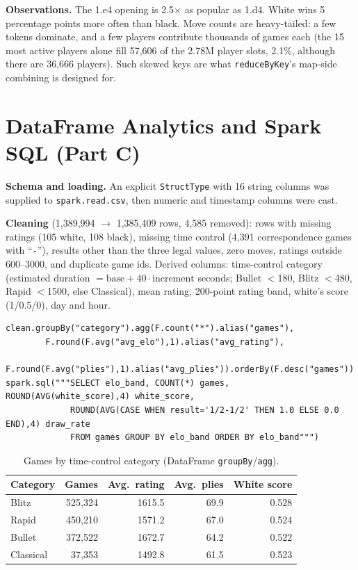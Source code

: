 \documentclass[11pt,a4paper]{article}
\begin{document}
\textbf{Observations.} The 1.e4 opening is 2.5$\times$ as popular as 1.d4. White wins
5 percentage points more often than black. Move counts are heavy-tailed: a few
tokens dominate, and a few players contribute thousands of games each
(the 15 most active players alone fill 57,606 of the 2.78M player slots, 2.1\%, although
there are 36,666 players). Such skewed keys are what \texttt{reduceByKey}'s map-side
combining is designed for.

\section{DataFrame Analytics and Spark SQL (Part C)}\label{sec:df}
\textbf{Schema and loading.} An explicit \texttt{StructType} with 16 string columns was
supplied to \texttt{spark.read.csv}, then numeric and timestamp columns were cast.

\textbf{Cleaning} (1,389,994 $\rightarrow$ 1,385,409 rows, 4,585 removed): rows with
missing ratings (105 white, 108 black), missing time control (4,391 correspondence games
with ``\texttt{-}''), results other than the three legal values, zero moves, ratings
outside 600--3000, and duplicate game ids. Derived columns: time-control category
(estimated duration $=\text{base}+40\cdot\text{increment}$ seconds; Bullet $<$180,
Blitz $<$480, Rapid $<$1500, else Classical), mean rating, 200-point rating band,
white's score (1/0.5/0), day and hour.

\begin{lstlisting}
clean.groupBy("category").agg(F.count("*").alias("games"),
        F.round(F.avg("avg_elo"),1).alias("avg_rating"),
        F.round(F.avg("plies"),1).alias("avg_plies")).orderBy(F.desc("games"))
spark.sql("""SELECT elo_band, COUNT(*) games, ROUND(AVG(white_score),4) white_score,
             ROUND(AVG(CASE WHEN result='1/2-1/2' THEN 1.0 ELSE 0.0 END),4) draw_rate
             FROM games GROUP BY elo_band ORDER BY elo_band""")
\end{lstlisting}

\begin{table}[H]\centering\small
\caption{Games by time-control category (DataFrame \texttt{groupBy}/\texttt{agg}).}
\begin{tabular}{@{}lrrrr@{}}\toprule
Category & Games & Avg.\ rating & Avg.\ plies & White score\\\midrule
Blitz & 525,324 & 1615.5 & 69.9 & 0.528\\
Rapid & 450,210 & 1571.2 & 67.0 & 0.524\\
Bullet & 372,522 & 1672.7 & 64.2 & 0.522\\
Classical & 37,353 & 1492.8 & 61.5 & 0.523\\\bottomrule
\end{tabular}\end{table}
\end{document}
